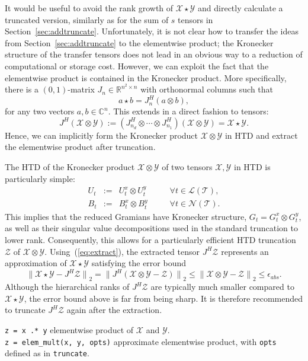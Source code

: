 \documentclass[11pt, a4paper]{article}
\newcommand{\calL}{\mathcal{L}}
\newcommand{\calN}{\mathcal{N}}
\newcommand{\calT}{\mathcal{T}}
\newcommand{\calX}{\mathcal{X}}
\newcommand{\calY}{\mathcal{Y}}
\newcommand{\calZ}{\mathcal{Z}}
\newcommand{\R}{{\mathbb R}}
\newcommand{\C}{{\mathbb C}}
\newcommand{\normb}[1]{{\bigl\|#1\bigr\|}}
\begin{document}
It would be useful
to avoid the rank growth of $\calX \star \calY$ and directly calculate
a truncated version,
similarly as for the sum of $s$ tensors 
in Section~\ref{sec:addtruncate}.
%
Unfortunately, it is not clear how to transfer the ideas from 
Section~\ref{sec:addtruncate} to the elementwise product; the Kronecker structure of the
transfer tensors does not lead in an obvious way to a reduction of computational or storage cost.
%
However, we can exploit the fact that the elementwise product
is contained in the Kronecker product. More specifically, there is
a $(0,1)$-matrix $J_n \in \R^{n^2\times n}$ with orthonormal 
columns such that
\[
a \star b = J_n^H (a \otimes b),
\]
for any two vectors $a,b\in \C^n$. This extends in a direct fashion to tensors:
\begin{equation} \label{eq:extract}
 J^H (\calX \otimes \calY) := 
(J_{n_d}^H \otimes \cdots \otimes J_{n_1}^H) (\calX \otimes \calY)
= \calX \star \calY.
\end{equation}
Hence, we can implicitly form the Kronecker product $\calX \otimes \calY$ in HTD and extract
the elementwise product after truncation.

The HTD of the Kronecker product $\calX \otimes \calY$ of two tensors $\calX, \calY$ in HTD is particularly simple:
\[ \begin{array}{rcll}
  {U}_t &:=& U_t^x \otimes U_t^y \qquad & \forall t \in \calL(\calT), \\
  {B}_t &:=& B_t^x \otimes B_t^y & \forall t \in \calN(\calT).
   \end{array}
\]
%
This implies that the reduced Gramians have Kronecker structure, $G_t = G_t^x \otimes G_t^y$,
as well as their singular value decompositions used in the standard truncation to lower rank.
Consequently, this allows for a particularly efficient HTD truncation
$\calZ$ of  $\calX \otimes \calY$. Using~(\ref{eq:extract}), the extracted tensor $J^H \calZ$ represents
an approximation of $\calX \star \calY$ satisfying the error bound
\[
\normb{\calX \star \calY - J^H \calZ}_2 
= \normb{J^H (\calX \otimes \calY - \calZ)}_2
\le \normb{\calX \otimes \calY - \calZ}_2 \le \epsilon_{abs}.
\]
Although the hierarchical ranks of $J^H \calZ$ are typically much smaller compared to $\calX \star \calY$,
the error bound above is far from being sharp.
It is therefore recommended to truncate
$J^H \calZ$ again after the extraction.

\begin{framed}\noindent
\texttt{z = x .* y} elementwise product of $\calX$ and $\calY$.\\
\texttt{z = elem\_mult(x, y, opts)} approximate elementwise product, with \texttt{opts} defined as in \texttt{truncate}.
\end{framed}
\end{document}
